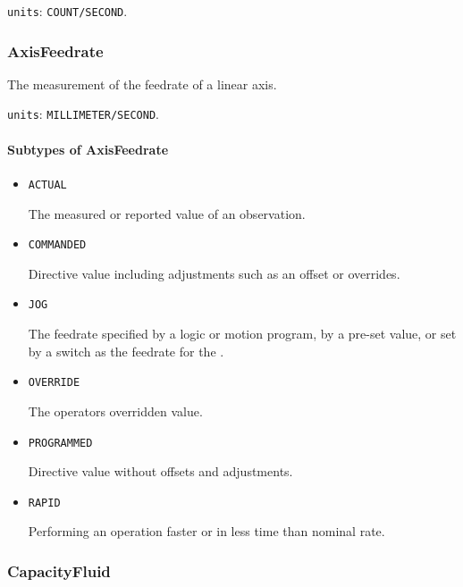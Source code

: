 \texttt{units}: \texttt{COUNT/SECOND}.


\subsubsection{AxisFeedrate}
\label{sec:AxisFeedrate}



The measurement of the feedrate of a linear axis.


\texttt{units}: \texttt{MILLIMETER/SECOND}.

\paragraph{Subtypes of AxisFeedrate}\mbox{}
\label{sec:Subtypes of AxisFeedrate}

\begin{itemize}

\item \texttt{ACTUAL}


The measured or reported value of an \gls{observation}.

\item \texttt{COMMANDED}


Directive value including adjustments such as an offset or overrides.

\item \texttt{JOG}


The feedrate specified by a logic or motion program, by a pre-set value, or set by a switch as the feedrate for the . 

\item \texttt{OVERRIDE}


The operators overridden value.

\item \texttt{PROGRAMMED}


Directive value without offsets and adjustments.

\item \texttt{RAPID}


Performing an operation faster or in less time than nominal rate.


\end{itemize}









\subsubsection{CapacityFluid}
\label{sec:CapacityFluid}



